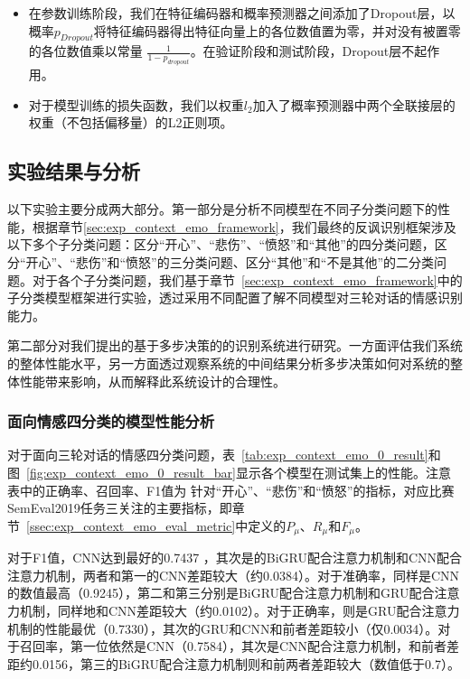 \begin{itemize}
\item 在参数训练阶段，我们在特征编码器和概率预测器之间添加了Dropout层，以概率$p_{Dropout}$将特征编码器得出特征向量上的各位数值置为零，并对没有被置零的各位数值乘以常量 $\frac{1}{1-p_{dropout}}$。在验证阶段和测试阶段，Dropout层不起作用。

\item 对于模型训练的损失函数，我们以权重$l_2$加入了概率预测器中两个全联接层的权重（不包括偏移量）的L2正则项。

\end{itemize}

\subsection{实验结果与分析}

以下实验主要分成两大部分。第一部分是分析不同模型在不同子分类问题下的性能，根据章节\ref{sec:exp_context_emo_framework}，我们最终的反讽识别框架涉及以下多个子分类问题：区分“开心”、“悲伤”、“愤怒”和“其他”的四分类问题，区分“开心”、“悲伤”和“愤怒”的三分类问题、区分“其他”和“不是其他”的二分类问题。对于各个子分类问题，我们基于章节~\ref{sec:exp_context_emo_framework}中的子分类模型框架进行实验，透过采用不同配置了解不同模型对三轮对话的情感识别能力。

第二部分对我们提出的基于多步决策的的识别系统进行研究。一方面评估我们系统的整体性能水平，另一方面透过观察系统的中间结果分析多步决策如何对系统的整体性能带来影响，从而解释此系统设计的合理性。

\subsubsection{面向情感四分类的模型性能分析}
\label{sssec:exp_context_emo_0_base}

对于面向三轮对话的情感四分类问题，表~\ref{tab:exp_context_emo_0_result}和图~\ref{fig:exp_context_emo_0_result_bar}显示各个模型在测试集上的性能。注意表中的正确率、召回率、F1值为
针对“开心”、“悲伤”和“愤怒”的指标，对应比赛SemEval2019任务三关注的主要指标，即章节~\ref{ssec:exp_context_emo_eval_metric}中定义的$P_\mu$、$R_\mu$和$F_\mu$。

对于F1值，CNN达到最好的0.7437 ，其次是的BiGRU配合注意力机制和CNN配合注意力机制，两者和第一的CNN差距较大（约0.0384）。对于准确率，同样是CNN的数值最高（0.9245），第二和第三分别是BiGRU配合注意力机制和GRU配合注意力机制，同样地和CNN差距较大（约0.0102）。对于正确率，则是GRU配合注意力机制的性能最优（0.7330），其次的GRU和CNN和前者差距较小（仅0.0034）。对于召回率，第一位依然是CNN（0.7584），其次是CNN配合注意力机制，和前者差距约0.0156，第三的BiGRU配合注意力机制则和前两者差距较大（数值低于0.7）。

